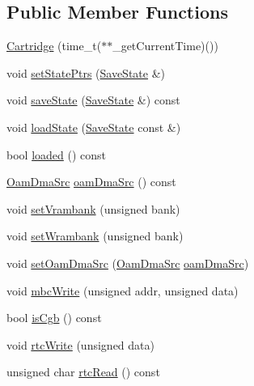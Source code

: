 \subsection*{Public Member Functions}
\begin{DoxyCompactItemize}
\item 
\hyperlink{classgambatte_1_1Cartridge_a02a7810564cf878e8a669b36818f760b}{Cartridge} (time\+\_\+t($\ast$$\ast$\+\_\+get\+Current\+Time)())
\item 
void \hyperlink{classgambatte_1_1Cartridge_ac4763db244cc009bfb86f169dec3f00a}{set\+State\+Ptrs} (\hyperlink{structgambatte_1_1SaveState}{Save\+State} \&)
\item 
void \hyperlink{classgambatte_1_1Cartridge_a0ac95a6edca7e01135de8808cb820850}{save\+State} (\hyperlink{structgambatte_1_1SaveState}{Save\+State} \&) const
\item 
void \hyperlink{classgambatte_1_1Cartridge_a2ea9929b798d88065ae39114a496d9b5}{load\+State} (\hyperlink{structgambatte_1_1SaveState}{Save\+State} const \&)
\item 
bool \hyperlink{classgambatte_1_1Cartridge_a765c0ba661feaa0f6ba9055a700f0cb4}{loaded} () const
\item 
\hyperlink{namespacegambatte_a2c5520a5fadf732ba8907450d802f51b}{Oam\+Dma\+Src} \hyperlink{classgambatte_1_1Cartridge_a32f9d2af10d44c526005df6c15f56e18}{oam\+Dma\+Src} () const
\item 
void \hyperlink{classgambatte_1_1Cartridge_a7a5643c7ff2f150fa67cf0570dfd06fa}{set\+Vrambank} (unsigned bank)
\item 
void \hyperlink{classgambatte_1_1Cartridge_a0b048b7d2c8eabdc557d1b4b80074345}{set\+Wrambank} (unsigned bank)
\item 
void \hyperlink{classgambatte_1_1Cartridge_a99aa834320ba188ae56edbd921aa99b6}{set\+Oam\+Dma\+Src} (\hyperlink{namespacegambatte_a2c5520a5fadf732ba8907450d802f51b}{Oam\+Dma\+Src} \hyperlink{classgambatte_1_1Cartridge_a32f9d2af10d44c526005df6c15f56e18}{oam\+Dma\+Src})
\item 
void \hyperlink{classgambatte_1_1Cartridge_ac560daf65ec58dfaee2b0142a2bc54af}{mbc\+Write} (unsigned addr, unsigned data)
\item 
bool \hyperlink{classgambatte_1_1Cartridge_a821a86fbca32b119dc3d18f99ff9ca42}{is\+Cgb} () const
\item 
void \hyperlink{classgambatte_1_1Cartridge_a0caa4fb15d1059ef3946988e581e526d}{rtc\+Write} (unsigned data)
\item 
unsigned char \hyperlink{classgambatte_1_1Cartridge_aa0c2605ee066351363516580e6945b16}{rtc\+Read} () const
$$
\end{DoxyCompactItemize}
